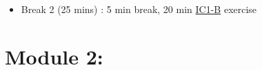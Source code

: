 \documentclass[oneside,11pt,dvipsnames]{book}
\begin{document}
\begin{itemize}
\item Break 2 (25 mins) :  5 min break,  20 min \href{https://nguyenthanhvuh.github.io/class-oo/assignments#ic1-b}{IC1-B} exercise

\end{itemize}



\section{Module 2:}



\end{document}
